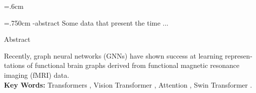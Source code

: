\baselineskip=.6cm
\begin{latin}
\latinfield{}
\latinkeywords{ }

\newpage
\thispagestyle{empty}
\baselineskip=.750cm
\en-abstract{%
Some data that present the time ...
}


\noindent
\begin{large}
\begin{center}
Abstract
\end{center}
\end{large}
%

Recently, graph neural networks (GNNs) have shown success at learning representations of functional brain graphs derived from functional magnetic resonance imaging (fMRI) data. 
\\
\newline
{{\bf Key Words:}} Transformers , Vision Transformer ,  Attention , Swin Transformer .%
\newpage
\latinvtitle
%
\end{latin}
